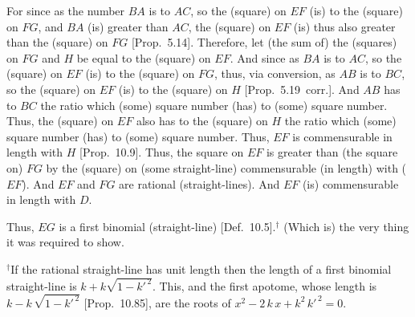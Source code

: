\begin{Parallel}{}{}
{
\centerline{}

For since as the number $BA$ is to $AC$, so the (square) on $EF$ (is)
to the (square) on $FG$, and $BA$ (is) greater than $AC$, the
(square) on $EF$ (is) thus also greater than the (square) on $FG$ [Prop.~5.14]. Therefore, let (the sum of) the (squares)
on $FG$ and $H$ be equal to the (square) on $EF$. And since as $BA$
is to $AC$, so the (square) on $EF$ (is) to the (square) on $FG$, thus,
via conversion, as $AB$ is to $BC$, so the (square) on $EF$ (is) to
the (square) on $H$ [Prop.~5.19~corr.]. 
And $AB$ has to $BC$ the ratio which (some) square number (has) to
(some) square number. Thus, the (square) on $EF$ also has to
the (square) on $H$ the ratio which (some) square number (has) to
(some) square number. Thus,
$EF$ is commensurable in length with $H$  [Prop.~10.9]. Thus, the square on $EF$
is greater than (the square on) $FG$ by the (square) on (some straight-line)
commensurable (in length) with ($EF$). And $EF$ and $FG$ are rational (straight-lines). And $EF$ (is) commensurable in length with $D$.

Thus, $EG$ is a first binomial (straight-line) [Def.~10.5].$^\dag$
(Which is) the very thing it was required to show.}
\end{Parallel}
{\footnotesize\noindent $^\dag$If the rational straight-line has unit length then the length of a first binomial straight-line
is  $k+k\sqrt{1-{k'}^{\,2}}$. This, and the first apotome,
whose length is $k-k\,\sqrt{1-{k'}^{\,2}}$ [Prop.~10.85],
are the roots of $x^2- 2\,k\,x+k^2\,{k'}^{\,2}=0$.}  \\~\\

